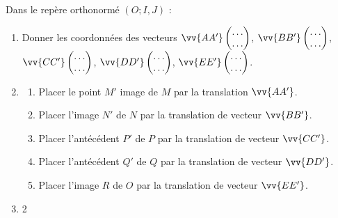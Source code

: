 \documentclass[main.tex]{subfiles}
\begin{document}
\begin{exercise}
\begin{minipage}{1\columnwidth}
	\end{minipage}
	
	Dans le repère orthonormé $(O; I,J)$ :  
	\begin{enumerate}[leftmargin=*, label=\arabic*)]
		\item Donner les coordonnées des vecteurs $\vv{AA'}\begin{pmatrix}
			\ldots \\ \ldots
		\end{pmatrix}$, $\vv{BB'}\begin{pmatrix}
			\ldots \\ \ldots
		\end{pmatrix}$, $\vv{CC'}\begin{pmatrix}
			\ldots \\ \ldots
		\end{pmatrix}$, $\vv{DD'}\begin{pmatrix}
			\ldots \\ \ldots
		\end{pmatrix}$, $\vv{EE'}\begin{pmatrix}
			\ldots \\ \ldots
		\end{pmatrix}$. 
		\item \begin{enumerate}[leftmargin=*, label=\alph*)]
			\item Placer le point $M'$ image de $M$ par la translation $\vv{AA'}$.
			\item Placer l'image $N'$ de $N$ par la translation de vecteur $\vv{BB'}$.
			\item Placer l'antécédent $P'$ de $P$ par la translation de vecteur $\vv{CC'}$. 
			\item Placer l'antécédent $Q'$ de $Q$ par la translation de vecteur $\vv{DD'}$.  
			\item Placer l'image $R$ de $O$ par la translation de vecteur $\vv{EE'}$.      
		\end{enumerate}  
		\item \begin{multicols}{2} 

\end{multicols}
\end{enumerate}
\end{exercise}
\end{document}
